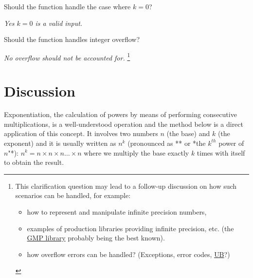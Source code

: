 \begin{QandA}
    \item \begin{questionitem} \begin{question} Should the function handle the case where $k=0$?  \end{question}      
    \begin{answered}
        \textit{Yes $k=0$ is a valid input.}
    \end{answered} \end{questionitem}
    
    \item \begin{questionitem} \begin{question} Should the function handles integer overflow?  \end{question}      
    \begin{answered}
        \textit{No overflow should not be accounted for. }\footnote{
            This clarification question may lead to a follow-up discussion on how such scenarios can be handled, for example: 
            \begin{itemize}
                \item how to represent and manipulate infinite precision numbers,
                \item examples of production libraries providing infinite precision, etc. (the \href{https://gmplib.org/}{GMP library}\cite{cit::web::gmplibrary} probably being the best known).
                \item how overflow errors can be handled? (Exceptions, error codes, \href{https://en.cppreference.com/w/cpp/language/ub}{UB}\cite{cit::std::ub}?)
            \end{itemize}
            }
    \end{answered} \end{questionitem}
        
\end{QandA}

\section{Discussion}
\label{exponentiation:sec:discussion}

Exponentiation, the calculation of powers by means of performing consecutive multiplications, is a well-understood operation and the method below is a direct application of this concept.  
It involves two numbers $n$ (the base) and $k$ (the exponent) and it is usually written as $n^k$ (pronounced as ** or *the ${k^{th}}$ power of $n$"*):
$n^k = n \times n \times n \ldots  \times n$ where we multiply the base exactly $k$ times with itself
to obtain the result. 

